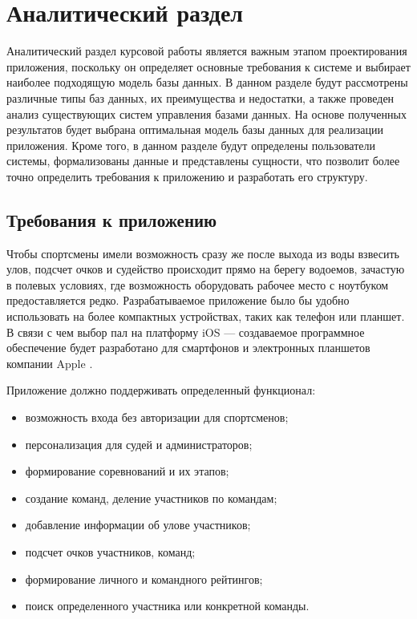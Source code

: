 \section{Аналитический раздел} \label{analysis}

Аналитический раздел курсовой работы является важным этапом проектирования приложения, поскольку он определяет основные требования к системе и выбирает наиболее подходящую модель базы данных. В данном разделе будут рассмотрены различные типы баз данных, их преимущества и недостатки, а также проведен анализ существующих систем управления базами данных. На основе полученных результатов будет выбрана оптимальная модель базы данных для реализации приложения. Кроме того, в данном разделе будут определены пользователи системы, формализованы данные и представлены сущности, что позволит более точно определить требования к приложению и разработать его структуру.

\subsection{Требования к приложению}

Чтобы спортсмены имели возможность сразу же после выхода из воды взвесить улов, подсчет очков и судейство происходит прямо на берегу водоемов, зачастую в полевых условиях, где возможность оборудовать рабочее место с ноутбуком предоставляется редко. Разрабатываемое приложение было бы удобно использовать на более компактных устройствах, таких как телефон или планшет. В связи с чем выбор пал на платформу iOS \cite{ios} --- создаваемое программное обеспечение будет разработано для смартфонов и электронных планшетов компании Apple \cite{apple}.

Приложение должно поддерживать определенный функционал:
\begin{itemize}[label=---]
	\item возможность входа без авторизации для спортсменов;
	\item персонализация для судей и администраторов;
	\item формирование соревнований и их этапов;
	\item создание команд, деление участников по командам;
	\item добавление информации об улове участников;
	\item подсчет очков участников, команд;
	\item формирование личного и командного рейтингов;
	\item поиск определенного участника или конкретной команды.
\end{itemize}

